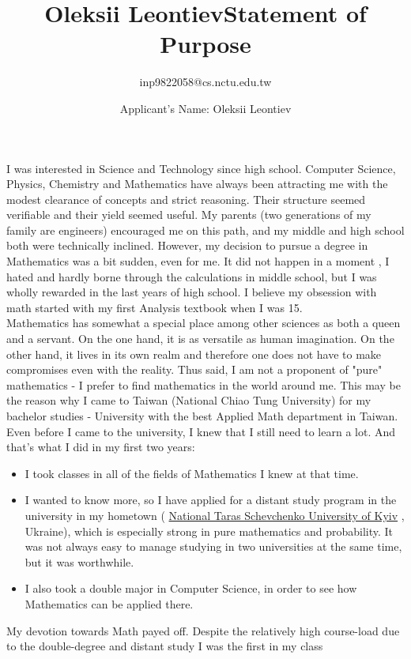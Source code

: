 \documentclass[10pt]{article}
\title{\bfseries\Huge Oleksii Leontiev}
\author{inp9822058@cs.nctu.edu.tw}
\date{}
\title{Statement of Purpose}
\author{Applicant's Name: Oleksii Leontiev}
\begin{document}
\maketitle
I was interested in Science and Technology since high school. Computer Science, Physics, Chemistry and Mathematics have always been
attracting me with the modest clearance of concepts and strict reasoning. Their structure seemed verifiable and their yield seemed useful.
My parents (two generations of my family are engineers) encouraged me on this path, and my middle and high school both were technically inclined.
However, my decision to pursue a degree in Mathematics was a bit sudden, even for me. It did not happen in a moment
, I hated and  hardly borne through the calculations in middle school, but I was wholly rewarded in the last years of high school. I believe
my obsession with math started with my first Analysis textbook when I was 15.\\
Mathematics has somewhat a special place among other sciences as both a queen and a servant. On the one hand, it is as versatile as human imagination.
On the other hand, it lives in its own realm and therefore one does not have to make compromises even with the reality. Thus said, I am not a proponent
of "pure" mathematics - I prefer to find mathematics in the world around me. This may be the reason why I came to Taiwan (National Chiao Tung
University) for my bachelor studies - University with the best Applied Math department in Taiwan.
\\Even before I came to the university, I knew that I still need to learn a lot.
And that's what I did in my first two years:
\begin{itemize}
	\item{I took classes in all of the fields of Mathematics I knew at that time.}
	\item{I wanted to know more, so I have applied for a distant study program in the university in my hometown (
\href{http://mechmat.univ.kiev.ua/e/}{National Taras Schevchenko University of Kyiv}
, Ukraine), which is especially
strong in pure mathematics and probability. It was not always easy to manage studying in two universities at the same time, but it was
worthwhile.}
	\item{
I also took a
double major in Computer Science, in order to see how Mathematics can be applied there.
		}
\end{itemize}
My devotion towards Math payed off. Despite the relatively high course-load due to the double-degree and distant study I was the first in my class
\end{document}
